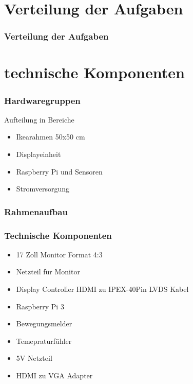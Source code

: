 \documentclass[11pt]{beamer}
\begin{document}
	\section{Verteilung der Aufgaben}
	\begin{frame}
		\frametitle{Verteilung der Aufgaben}
	\end{frame}

	\section{technische Komponenten}
	\begin{frame}
		\frametitle{Hardwaregruppen}
		\begin{center}
			\Large{Aufteilung in Bereiche}
		\end{center}
		\begin{itemize}
		\item Ikearahmen 50x50 cm
		\item Displayeinheit
		\item Raspberry Pi und Sensoren
		\item Stromversorgung
		\end{itemize}
	\end{frame}
	
	\begin{frame}
		\frametitle{Rahmenaufbau}
	\end{frame}		

	\begin{frame}
		\frametitle{Technische Komponenten}
		\begin{itemize}
		\item 17 Zoll Monitor Format 4:3
		\item Netzteil für Monitor
		\item Display Controller HDMI zu IPEX-40Pin LVDS Kabel 
		\item Raspberry Pi 3
		\item Bewegungsmelder
		\item Temepraturfühler
		\item 5V Netzteil
		\item HDMI zu VGA Adapter
		\end{itemize}
	\end{frame}
\end{document}
